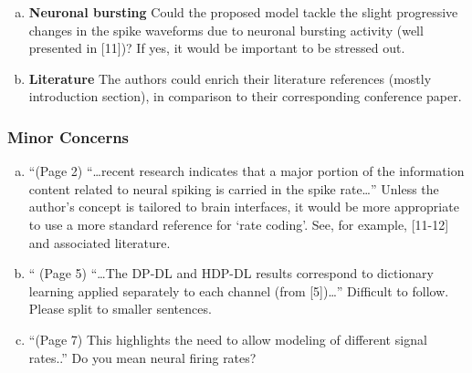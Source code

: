\begin{enumerate}[a.]
	\item \textbf{Neuronal bursting} Could the proposed model tackle the slight progressive changes in the spike waveforms due to neuronal bursting activity (well presented in [11])? If yes, it would be important to be stressed out.
	
	
	\item \textbf{Literature} The authors could enrich their literature references (mostly introduction section), in comparison to their corresponding conference paper.
	
	
\end{enumerate}




\subsubsection{Minor Concerns} %
\label{ssub:minor_concerns}



\begin{enumerate}[a.]
	\item “(Page 2) ``\ldots recent research indicates that a major portion of the information content related to neural spiking is carried in the spike rate\ldots''
	Unless the author’s concept is tailored to brain interfaces, it would be more appropriate to use a more standard reference for ‘rate coding’. See, for example, [11-12] and associated literature.
	
	
	\item “ (Page 5) ``\ldots The DP-DL and HDP-DL results correspond to dictionary learning applied separately to each channel (from [5])\ldots''
	Difficult to follow. Please split to smaller sentences.
	
	
	\item “(Page 7) This highlights the need to allow modeling of different signal rates..”
	Do you mean neural firing rates?
	
\end{enumerate}











% 







